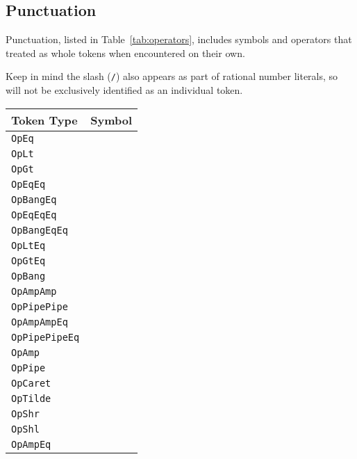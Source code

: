 \subsection{Punctuation}
\FloatBarrier

Punctuation, listed in Table~\ref{tab:operators}, includes symbols and operators that
treated as whole tokens when encountered on their own.

Keep in mind the slash (\texttt{/}) also appears as part of rational number literals, so
will not be exclusively identified as an individual token.

\begin{table}[h]
\parbox[t]{0.45\linewidth}{
    \centering
    \begin{tabular}[t]{ll}
        \hline
        \textbf{Token Type} & \textbf{Symbol} \\
        \hline
        \texttt{OpEq} & \op{=} \\
        \texttt{OpLt} & \op{<} \\
        \texttt{OpGt} & \op{>} \\
        \texttt{OpEqEq} & \op{==} \\
        \texttt{OpBangEq} & \op{!=} \\
        \texttt{OpEqEqEq} & \op{===} \\
        \texttt{OpBangEqEq} & \op{!==} \\
        \texttt{OpLtEq} & \op{<=} \\
        \texttt{OpGtEq} & \op{>=} \\
        \hline
        \texttt{OpBang} & \op{!} \\
        \texttt{OpAmpAmp} & \op{\&\&} \\
        \texttt{OpPipePipe} & \op{||} \\
        \texttt{OpAmpAmpEq} & \op{\&\&=} \\
        \texttt{OpPipePipeEq} & \op{||=} \\
        \hline
        \texttt{OpAmp} & \op{\&} \\
        \texttt{OpPipe} & \op{|} \\
        \texttt{OpCaret} & \op{\textasciicircum} \\
        \texttt{OpTilde} & \op{\textasciitilde} \\
        \texttt{OpShr} & \op{\textasciitilde>} \\
        \texttt{OpShl} & \op{<\textasciitilde} \\
        \hline
        \texttt{OpAmpEq} & \op{\&=} \\

\end{tabular}}
\end{table}
